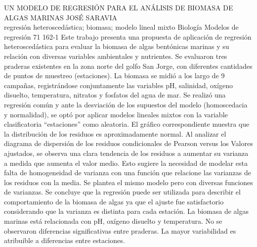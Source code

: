 \A
{UN MODELO DE REGRESIÓN PARA EL ANÁLISIS DE BIOMASA DE ALGAS MARINAS}
{JOSÉ SARAVIA}
{
\\
}
{regresión heteroscedástica; biomasa; modelo lineal mixto} 
 {Biología} 
 {Modelos de regresión} 
 {71} 
 {162-1}
{Este trabajo presenta una propuesta de aplicación de regresión heteroscedástica para evaluar la biomasa de algas bentónicas marinas y su relación con diversas variables ambientales y nutrientes. Se evaluaron tres praderas existentes en la zona norte del golfo San Jorge, con diferentes cantidades de puntos de muestreo (estaciones). La biomasa se midió a los largo de 9 campañas, registrándose conjuntamente las variables pH, salinidad, oxígeno disuelto, temperatura, nitratos y fosfatos del agua de mar. Se realizó una regresión común y ante la desviación de los supuestos del modelo (homoscedacia y normalidad), se optó por aplicar modelos lineales mixtos con la variable clasificatoria “estaciones” como aleatoria. El gráfico correspondiente muestra que la distribución de los residuos es aproximadamente normal. Al analizar el diagrama de dispersión de los residuos condicionales de Pearson versus los Valores ajustados, se observa una clara tendencia de los residuos a aumentar su varianza a medida que aumenta el valor medio. Esto sugiere la necesidad de modelar esta falta de homogeneidad de varianza con una función que relacione las varianzas de los residuos con la media. Se plantea el mismo modelo pero con diversas funciones de varianzas. Se concluye que la regresión puede ser utilizada para describir el comportamiento de la biomasa de algas ya que el ajuste fue satisfactorio considerando que la varianza es distinta para cada estación. La biomasa de algas marinas está relacionada con pH, oxígeno disuelto y temperatura. No se observaron diferencias significativas entre praderas. La mayor variabilidad es atribuible a diferencias entre estaciones.}
